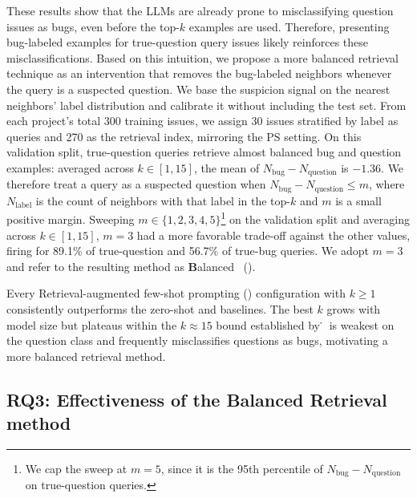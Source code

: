These results show that the LLMs are already prone to misclassifying question issues as bugs, even before the top-$k$ examples are used. Therefore, presenting bug-labeled examples for true-question query issues likely reinforces these misclassifications. Based on this intuition, we propose a more balanced retrieval technique as an intervention that removes the bug-labeled neighbors whenever the query is a suspected question. We base the suspicion signal on the nearest neighbors' label distribution and calibrate it without including the test set. From each project's total 300 training issues, we assign 30 issues stratified by label as queries and 270 as the retrieval index, mirroring the PS setting. On this validation split, true-question queries retrieve almost balanced bug and question examples: averaged across $k\in[1,15]$, the mean of $N_\text{bug} - N_\text{question}$ is $-1.36$. We therefore treat a query as a suspected question when $N_\text{bug} - N_\text{question} \le m$, where $N_\text{label}$ is the count of neighbors with that label in the top-$k$ and $m$ is a small positive margin. Sweeping $m\in\{1,2,3,4,5\}$\footnote{We cap the sweep at $m{=}5$, since it is the 95th percentile of $N_\text{bug} - N_\text{question}$ on true-question queries.} on the validation split and averaging across $k\in[1,15]$, $m{=}3$ had a more favorable trade-off against the other values, firing for 89.1\% of true-question and 56.7\% of true-bug queries. We adopt $m{=}3$ and refer to the resulting method as \textbf{B}alanced \ragtag\ (\bragtag).

\begin{myboxi}
Every Retrieval-augmented few-shot prompting (\ragtag) configuration with $k{\ge}1$ consistently outperforms the zero-shot and \votag baselines. The best $k$ grows with model size but plateaus within the $k\approx15$ bound established by \votag\. \ragtag\ is weakest on the question class and frequently misclassifies questions as bugs, motivating a more balanced retrieval method. 
\end{myboxi}

\subsection{RQ3: Effectiveness of the Balanced Retrieval method}
\label{sec:bragtag}

